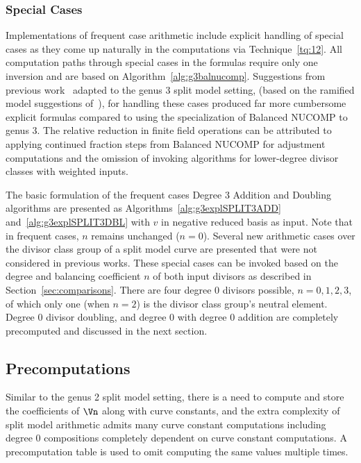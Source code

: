 \subsubsection{Special Cases}
Implementations of frequent case arithmetic include explicit handling of special
cases as they come up naturally in the computations via Technique~\ref{tq:12}.
All computation paths through special cases in the formulas require only one
inversion and are based on Algorithm~\ref{alg:g3balnucomp}. Suggestions from
previous work~\cite{EricksonJacobsonStein_realg2_2011} adapted to the genus 3
split model setting, (based on the ramified model suggestions
of~\cite{Lange_explicit_2005}), for handling these cases produced far more
cumbersome explicit formulas compared to using the specialization of Balanced
NUCOMP to genus 3. The relative reduction in finite field operations can be
attributed to applying continued fraction steps from Balanced NUCOMP for
adjustment computations and the omission of invoking algorithms for lower-degree
divisor classes with weighted inputs.

The basic formulation of the frequent cases Degree 3 Addition and Doubling
algorithms are presented as Algorithms~\ref{alg:g3explSPLIT3ADD}
and~\ref{alg:g3explSPLIT3DBL} with  $v$ in negative reduced basis as input. Note
that in frequent cases, $n$ remains unchanged ($n = 0$). Several new arithmetic
cases over the divisor class group of a split model curve are presented that
were not considered in previous works. These special cases can be invoked based
on the degree and balancing coefficient $n$ of both input divisors as described
in Section~\ref{sec:comparisons}. There are four degree 0 divisors possible,
$n=0,1,2,3$, of which only one (when $n=2$) is the divisor class group's neutral
element. Degree 0 divisor doubling, and degree 0 with degree 0 addition are
completely precomputed and discussed in the next section.

\subsection{Precomputations}\label{sec:g3precompute}
Similar to the genus 2 split model setting, there is a need to compute and store
the coefficients of $\Vn$ along with curve constants, and the extra complexity
of split model arithmetic admits many curve constant computations including
degree 0 compositions completely dependent on curve constant computations. A
precomputation table is used to omit computing the same values multiple times.

